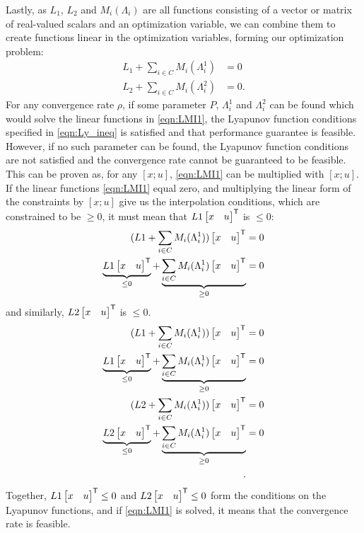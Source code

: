 Lastly, as $L_1$, $L_2$ and $M_i(\Lambda_i)$ are all functions consisting of a vector or matrix of real-valued scalars and an optimization variable, we can combine them to create functions linear in the optimization variables, forming our optimization problem:
\begin{subequations} \label{eqn:LMI1}
	\begin{align} 
		L_1 + \sum_{i\in C} M_i(\Lambda_i^1) &= 0  \\
		L_2 + \sum_{i\in C} M_i(\Lambda_i^2) &= 0.
	\end{align}
\end{subequations}
For any convergence rate $\rho$, if some parameter $P$, $\Lambda_i^1$ and $\Lambda_i^2$ can be found which would solve the linear functions in \eqref{eqn:LMI1}, the Lyapunov function conditions specified in \eqref{eqn:Ly_ineq} is satisfied and that performance guarantee is feasible. However, if no such parameter can be found, the Lyapunov function conditions are not satisfied and the convergence rate cannot be guaranteed to be feasible. This can be proven as, for any $[x; u]$, \eqref{eqn:LMI1} can be multiplied with $[x; u]$. If the linear functions \eqref{eqn:LMI1} equal zero, and multiplying the linear form of the constraints by $[x; u]$ give us the interpolation conditions, which are constrained to be $\geq 0$, it must mean that $L1\begin{bmatrix}x & u\end{bmatrix}^{\mathsf{T}}$ is $\leq 0$:
\begin{subequations} \label{eqn:LMI2}
	\begin{align} 
		(L1 + \sum_{i\in C} M_i(\Lambda_i^1))\begin{bmatrix}x & u\end{bmatrix}^{\mathsf{T}} &= 0  \\
		\underbrace{L1\begin{bmatrix}x & u\end{bmatrix}^{\mathsf{T}}}_{\leq 0} + \underbrace{\sum_{i\in C} M_i(\Lambda_i^1)\begin{bmatrix}x & u\end{bmatrix}^{\mathsf{T}}}_{\geq 0} &= 0  \\
	\end{align}
\end{subequations}
and similarly, $L2\begin{bmatrix}x & u\end{bmatrix}^{\mathsf{T}}$ is $\leq 0$.
\begin{subequations} \label{eqn:LMI3}
	\begin{align*} 
		(L1 + \sum_{i\in C} M_i(\Lambda_i^1))\begin{bmatrix}x & u\end{bmatrix}^{\mathsf{T}} &= 0  \\
		\underbrace{L1\begin{bmatrix}x & u\end{bmatrix}^{\mathsf{T}}}_{\leq 0} + \underbrace{\sum_{i\in C} M_i(\Lambda_i^1)\begin{bmatrix}x & u\end{bmatrix}^{\mathsf{T}}}_{\geq 0} &= 0  \\
		(L2 + \sum_{i\in C} M_i(\Lambda_i^1))\begin{bmatrix}x & u\end{bmatrix}^{\mathsf{T}} &= 0  \\
		\underbrace{L2\begin{bmatrix}x & u\end{bmatrix}^{\mathsf{T}}}_{\leq 0} + \underbrace{\sum_{i\in C} M_i(\Lambda_i^1)\begin{bmatrix}x & u\end{bmatrix}^{\mathsf{T}}}_{\geq 0} &= 0  \\.
	\end{align*}
\end{subequations}
Together, $L1\begin{bmatrix}x & u\end{bmatrix}^{\mathsf{T}} \leq 0$ and $L2\begin{bmatrix}x & u\end{bmatrix}^{\mathsf{T}} \leq 0$ form the conditions on the Lyapunov functions, and if \eqref{eqn:LMI1} is solved, it means that the convergence rate is feasible.

